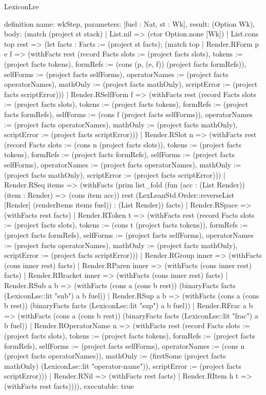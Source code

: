 \begin{lexlean}{LexiconLre}
\begin{semanticmodule}
definition{
  name: wkStep,
  parameters: [fuel : Nat, st : Wk],
  result: (Option Wk),
  body: (match (project st stack)
    | List.nil => (ctor Option.none [Wk])
    | List.cons top rest => (let facts : Facts := (project st facts); (match top
      | Render.RForm p e f => (withFacts rest (record Facts {slots := (project facts slots), tokens := (project facts tokens), formRefs := (cons (p, (e, f)) (project facts formRefs)), selfForms := (project facts selfForms), operatorNames := (project facts operatorNames), mathOnly := (project facts mathOnly), scriptError := (project facts scriptError)}))
      | Render.RSelfForm f => (withFacts rest (record Facts {slots := (project facts slots), tokens := (project facts tokens), formRefs := (project facts formRefs), selfForms := (cons f (project facts selfForms)), operatorNames := (project facts operatorNames), mathOnly := (project facts mathOnly), scriptError := (project facts scriptError)}))
      | Render.RSlot n => (withFacts rest (record Facts {slots := (cons n (project facts slots)), tokens := (project facts tokens), formRefs := (project facts formRefs), selfForms := (project facts selfForms), operatorNames := (project facts operatorNames), mathOnly := (project facts mathOnly), scriptError := (project facts scriptError)}))
      | Render.RSeq items => (withFacts (prim list_fold (fun (acc : (List Render)) (item : Render) => (cons item acc)) rest (LexLeanStd.Order::reverseList [Render] (renderItems items fuel)) : (List Render)) facts)
      | Render.RSpace => (withFacts rest facts)
      | Render.RToken t => (withFacts rest (record Facts {slots := (project facts slots), tokens := (cons t (project facts tokens)), formRefs := (project facts formRefs), selfForms := (project facts selfForms), operatorNames := (project facts operatorNames), mathOnly := (project facts mathOnly), scriptError := (project facts scriptError)}))
      | Render.RGroup inner => (withFacts (cons inner rest) facts)
      | Render.RParen inner => (withFacts (cons inner rest) facts)
      | Render.RBracket inner => (withFacts (cons inner rest) facts)
      | Render.RSub a b => (withFacts (cons a (cons b rest)) (binaryFacts facts (LexiconLse::lit "sub") a b fuel))
      | Render.RSup a b => (withFacts (cons a (cons b rest)) (binaryFacts facts (LexiconLse::lit "sup") a b fuel))
      | Render.RFrac a b => (withFacts (cons a (cons b rest)) (binaryFacts facts (LexiconLse::lit "frac") a b fuel))
      | Render.ROperatorName n => (withFacts rest (record Facts {slots := (project facts slots), tokens := (project facts tokens), formRefs := (project facts formRefs), selfForms := (project facts selfForms), operatorNames := (cons n (project facts operatorNames)), mathOnly := (firstSome (project facts mathOnly) (LexiconLse::lit "operator-name")), scriptError := (project facts scriptError)}))
      | Render.RNil => (withFacts rest facts)
      | Render.RItem h t => (withFacts rest facts)))),
  executable: true
}


\end{semanticmodule}
\end{lexlean}

